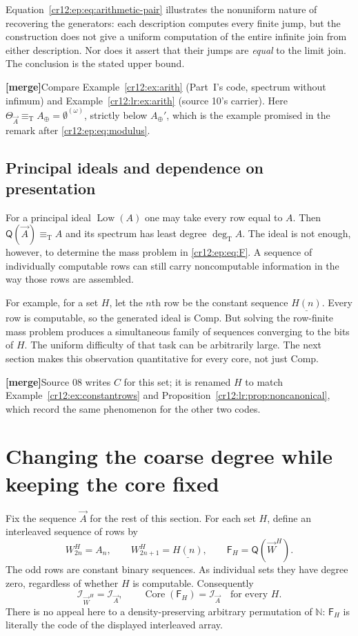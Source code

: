 \documentclass[11pt,letterpaper]{article}
\theoremstyle{plain}
\theoremstyle{definition}
\theoremstyle{remark}
\numberwithin{equation}{section}
\newcommand{\N}{\mathbb N}
\newcommand{\eqT}{\equiv_{\mathrm T}}
\newcommand{\Core}{\operatorname{Core}}
\newcommand{\Low}{\operatorname{Low}}
\newcommand{\Comp}{\mathrm{Comp}}
\newcommand{\degT}{\deg_{\mathrm T}}
\newcommand{\I}{\mathcal I}
\newcommand{\mergenote}[1]{\par\smallskip\noindent
 {\small\textsf{\textbf{[merge]}}\enspace #1}\par\smallskip}
\newcommand{\Aplus}{A_{\oplus}}          %
\newcommand{\QQ}{\mathsf Q}              %
\newcommand{\Fint}{\mathsf F}            %
\newcommand{\WW}{\vec W}                 %
\newcommand{\bitconst}[1]{\underline{#1}}
\begin{document}
Equation~\eqref{cr12:ep:eq:arithmetic-pair} illustrates the nonuniform nature of
recovering the generators: each description computes every finite jump, but the
construction does not give a uniform computation of the entire infinite join from
either description. Nor does it assert that their jumps are \emph{equal} to the
limit join. The conclusion is the stated upper bound.

\mergenote{Compare Example~\ref{cr12:ex:arith} (Part~I's code, spectrum without
infimum) and Example~\ref{cr12:lr:ex:arith} (source 10's carrier). Here
$\Theta_{\vec A}\eqT\Aplus=\emptyset^{(\omega)}$, strictly below
$\Aplus'$, which is the example promised in the remark after
\eqref{cr12:ep:eq:modulus}.}

\subsection{Principal ideals and dependence on presentation}\label{cr12:ep:subsec:presentation}
For a principal ideal $\Low(A)$ one may take every row equal to $A$. Then
$\QQ(\vec A)\eqT A$ and its spectrum has least degree $\degT A$. The ideal is not
enough, however, to determine the mass problem in \eqref{cr12:ep:eq:F}. A sequence of
individually computable rows can still carry noncomputable information in the way
those rows are assembled.

For example, for a set $H$, let the $n$th row be the constant sequence
$\bitconst{H(n)}$. Every row is computable, so the generated ideal is $\Comp$. But
solving the row-finite mass problem produces a simultaneous family of sequences
converging to the bits of $H$. The uniform difficulty of that task can be
arbitrarily large. The next section makes this observation quantitative for every
core, not just $\Comp$.

\mergenote{Source 08 writes $C$ for this set; it is renamed $H$ to match
Example~\ref{cr12:ex:constantrows} and Proposition~\ref{cr12:lr:prop:noncanonical},
which record the same phenomenon for the other two codes.}

\section{Changing the coarse degree while keeping the core fixed}\label{cr12:ep:sec:fibres}
Fix the sequence $\vec A$ for the rest of this section. For each set $H$, define an
interleaved sequence of rows by
\begin{equation}\label{cr12:ep:eq:W}
 W^H_{2n}=A_n,\qquad W^H_{2n+1}=\bitconst{H(n)},
 \qquad \Fint_H=\QQ(\WW^H).
\end{equation}
The odd rows are constant binary sequences. As individual sets they have degree
zero, regardless of whether $H$ is computable. Consequently
\begin{equation}\label{cr12:ep:eq:samecore}
 \I_{\WW^H}=\I_{\vec A},\qquad \Core(\Fint_H)=\I_{\vec A}
 \quad\text{for every }H.
\end{equation}
There is no appeal here to a density-preserving arbitrary permutation of $\N$:
$\Fint_H$ is literally the code of the displayed interleaved array.
\end{document}
